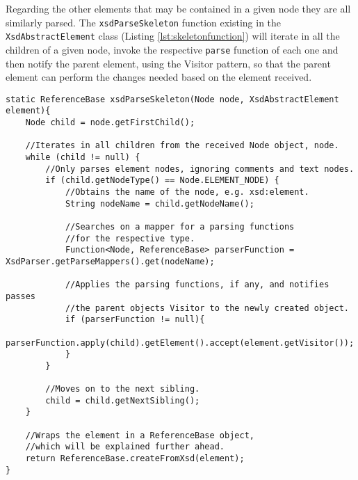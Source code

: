\noindent
Regarding the other elements that may be contained in a given node they are all similarly parsed. The \texttt{xsdParseSkeleton} function existing in the \texttt{XsdAbstractElement} class (Listing \ref{lst:skeletonfunction}) will iterate in all the children of a given node, invoke the respective \texttt{parse} function of each one and then notify the parent element, using the Visitor pattern, so that the parent element can perform the changes needed based on the element received.

\bigskip

\begin{minipage}{\linewidth}
\begin{lstlisting}[caption={XsdParseSkeleton Parsing Children From a Node},captionpos=b,label={lst:skeletonfunction}]
static ReferenceBase xsdParseSkeleton(Node node, XsdAbstractElement element){
    Node child = node.getFirstChild();

    //Iterates in all children from the received Node object, node.
    while (child != null) {   
        //Only parses element nodes, ignoring comments and text nodes.
        if (child.getNodeType() == Node.ELEMENT_NODE) { 
            //Obtains the name of the node, e.g. xsd:element.
            String nodeName = child.getNodeName();

            //Searches on a mapper for a parsing functions 
            //for the respective type.
            Function<Node, ReferenceBase> parserFunction = XsdParser.getParseMappers().get(nodeName);

            //Applies the parsing functions, if any, and notifies passes 
            //the parent objects Visitor to the newly created object.
            if (parserFunction != null){
                parserFunction.apply(child).getElement().accept(element.getVisitor());
            }
        }

        //Moves on to the next sibling.
        child = child.getNextSibling();
    }

    //Wraps the element in a ReferenceBase object, 
    //which will be explained further ahead.
    return ReferenceBase.createFromXsd(element);
}
\end{lstlisting}
\end{minipage}

\newpage

